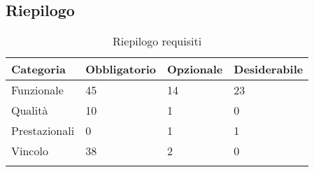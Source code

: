 \documentclass[../AnalisiDeiRequisiti.tex]{subfiles}
\begin{document}
	\newpage
	\subsection{Riepilogo}
		\begin{longtabu} to \textwidth {X X X X}
		\toprule
		\textbf{Categoria} & \textbf{Obbligatorio} & \textbf{Opzionale} & \textbf{Desiderabile}\\
		\midrule
		\endhead
		\midrule 
		Funzionale & 45 & 14 & 23 \\ 
		\midrule 
		Qualità & 10 & 1 & 0 \\ 
		\midrule 
		Prestazionali & 0 & 1 & 1 \\ 
		\midrule 
		Vincolo & 38 & 2 & 0 \\ 
		\bottomrule
		\caption{Riepilogo requisiti} \\
		\end{longtabu}
\end{document}
